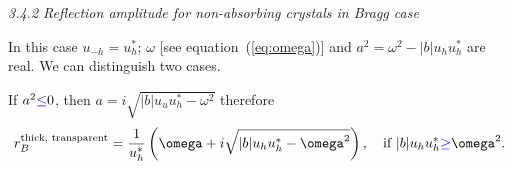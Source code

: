 \documentclass[preprint]{iucr}              %
\newcommand{\todo}[1]{{\color{red}[TODO: "#1'']}}
\newcommand{\inblue}[1]{{\color{blue}#1}}
\begin{document}


\textit{3.4.2  Reflection amplitude for non-absorbing crystals in Bragg case}

In this case $u_{-h}=u^*_h$; $\omega$ [see equation~(\ref{eq:omega})] and $a^2=\omega^2-|b| u_h u_{h}^*$ are real. We can distinguish two cases. 

If $a^2\inblue{\le}0$, then $a=i\sqrt{|b|u_u u_h^* - \omega^2}$ therefore
\begin{equation}\label{eq:totalreflection}
    r_B^{\text{thick, transparent}} =
    \frac{1}{u_{h}^*}\left( \omega+i\sqrt{|b|u_h u_h^*-\omega^2} \right), ~~~ \text{if~}|b|u_h u_h^* \inblue{\ge} \omega^2.
\end{equation}
\end{document}
